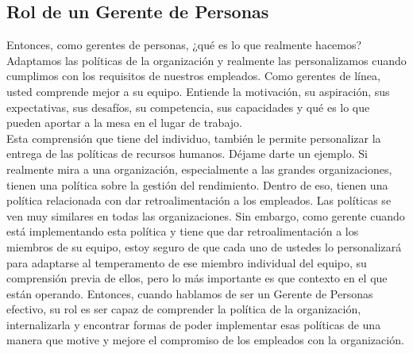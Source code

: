 \documentclass[10pt]{book}
\begin{document}
\subsection{Rol de un Gerente de Personas}
Entonces, como gerentes de personas, ¿qué es lo que realmente hacemos? Adaptamos las políticas de la organización y realmente las personalizamos cuando cumplimos con los requisitos de nuestros empleados. Como gerentes de línea, usted comprende mejor a su equipo. Entiende la motivación, su aspiración, sus expectativas, sus desafíos, su competencia, sus capacidades y qué es lo que pueden aportar a la mesa en el lugar de trabajo.\\
Esta comprensión que tiene del individuo, también le permite personalizar la entrega de las políticas de recursos humanos. Déjame darte un ejemplo. Si realmente mira a una organización, especialmente a las grandes organizaciones, tienen una política sobre la gestión del rendimiento. Dentro de eso, tienen una política relacionada con dar retroalimentación a los empleados. Las políticas se ven muy similares en todas las organizaciones. Sin embargo, como gerente cuando está implementando esta política y tiene que dar retroalimentación a los miembros de su equipo, estoy seguro de que cada uno de ustedes lo personalizará para adaptarse al temperamento de ese miembro individual del equipo, su comprensión previa de ellos, pero lo más importante es que contexto en el que están operando. Entonces, cuando hablamos de ser un Gerente de Personas efectivo, su rol es ser capaz de comprender la política de la organización, internalizarla y encontrar formas de poder implementar esas políticas de una manera que motive y mejore el compromiso de los empleados con la organización.
\end{document}

